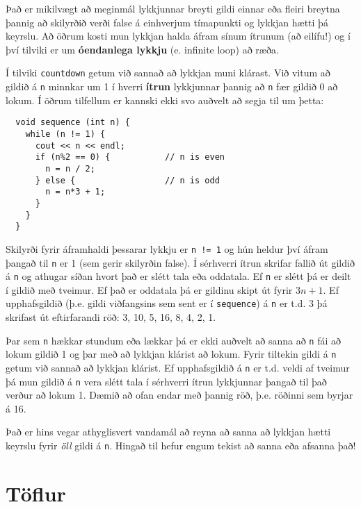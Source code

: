 
Það er mikilvægt að meginmál lykkjunnar breyti gildi einnar eða fleiri breytna þannig að skilyrðið verði false á einhverjum tímapunkti og lykkjan hætti þá keyrslu.
Að öðrum kosti mun lykkjan halda áfram sínum ítrunum (að eilífu!) og í því tilviki er um {\bf óendanlega lykkju} (e. infinite loop) að ræða.

Í tilviki {\tt countdown} getum við sannað að lykkjan muni klárast.
Við vitum að gildið á {\tt n} minnkar um 1 í hverri {\bf ítrun} lykkjunnar þannig að {\tt n} fær gildið 0 að lokum.
Í öðrum tilfellum er kannski ekki svo auðvelt að segja til um þetta:

\begin{verbatim}
  void sequence (int n) {
    while (n != 1) {
      cout << n << endl;
      if (n%2 == 0) {           // n is even
        n = n / 2;
      } else {                  // n is odd
        n = n*3 + 1;
      }
    }
  }
\end{verbatim}
%
Skilyrði fyrir áframhaldi þessarar lykkju er {\tt n != 1} og hún heldur því áfram þangað til {\tt n} er 1 (sem gerir skilyrðin false).
Í sérhverri ítrun skrifar fallið út gildið á {\tt n} og athugar síðan hvort það er slétt tala eða oddatala.
Ef {\tt n} er slétt þá er deilt í gildið með tveimur.
Ef það er oddatala þá er gildinu skipt út fyrir $3n+1$.
Ef upphafsgildið (þ.e. gildi viðfangsins sem sent er í {\tt sequence}) á {\tt n} er t.d. 3 þá skrifast út eftirfarandi röð:
3, 10, 5, 16, 8, 4, 2, 1.

Þar sem {\tt n} hækkar stundum eða lækkar þá er ekki auðvelt að sanna að {\tt n} fái að lokum gildið 1 og þar með að lykkjan klárist að lokum.
Fyrir tiltekin gildi á {\tt n} getum við sannað að lykkjan klárist.
Ef upphafsgildið á {\tt n} er t.d. veldi af tveimur þá mun gildið á {\tt n} vera slétt tala í sérhverri ítrun lykkjunnar þangað til það verður að lokum 1.
Dæmið að ofan endar með þannig röð, þ.e. röðinni sem byrjar á 16.

Það er hins vegar athyglisvert vandamál að reyna að sanna að lykkjan hætti keyrslu fyrir {\em öll} gildi á {\tt n}.
Hingað til hefur engum tekist að sanna eða afsanna það!

\section{Töflur}

